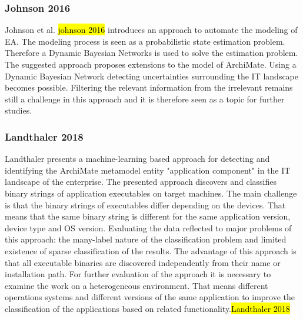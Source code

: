 \subsubsection{Johnson 2016}
Johnson et al. \hl{johnson 2016} introduces an approach to automate the modeling of EA. The modeling process is seen as a probabilistic state estimation problem. Therefore a Dynamic Bayesian Networks is used to solve the estimation problem. The suggested approach proposes extensions to the model of ArchiMate. Using a Dynamic Bayesian Network detecting uncertainties surrounding the IT landscape becomes possible. Filtering the relevant information from the irrelevant remains still a challenge in this approach and it is therefore seen as a topic for further studies.

\subsubsection{Landthaler 2018}
Landthaler presents a machine-learning based approach for detecting and identifying the ArchiMate metamodel entity "application component" in the IT landscape of the enterprise. The presented approach discovers and classifies binary strings of application executables on target machines. The main challenge is that the binary strings of executables differ depending on the devices. That means that the same binary string is different for the same application version, device type and OS version. Evaluating the data reflected to major problems of this approach: the many-label nature of the classification problem and limited existence of sparse classification of the results.
The advantage of this approach is that all executable binaries are discovered independently from their name or installation path. 
For further evaluation of the approach it is necessary to examine the work on a heterogeneous environment. That means different operations systems and different versions of the same application to improve the classification of the applications based on related functionality.\hl{Landthaler 2018}

